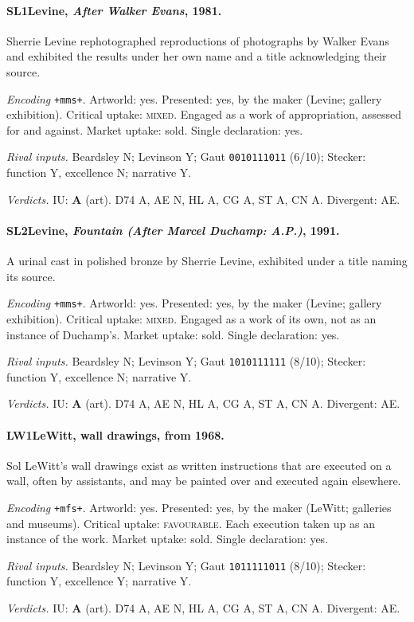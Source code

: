 \paragraph{SL1\enspace Levine, \emph{After Walker Evans}, 1981.}
Sherrie Levine rephotographed reproductions of photographs by Walker Evans and exhibited the results under her own name and a title acknowledging their source.\par
\noindent\textit{Encoding} \texttt{+mms+}. Artworld: yes. Presented: yes, by the maker (Levine; gallery exhibition). Critical uptake: \textsc{mixed}. Engaged as a work of appropriation, assessed for and against. Market uptake: sold. Single declaration: yes.\par
\noindent\textit{Rival inputs.} Beardsley N; Levinson Y; Gaut \texttt{0010111011} (6/10); Stecker: function Y, excellence N; narrative Y.\par
\noindent\textit{Verdicts.} IU: \textbf{A} (art). D74 A, AE N, HL A, CG A, ST A, CN A. Divergent: AE.\par

\paragraph{SL2\enspace Levine, \emph{Fountain (After Marcel Duchamp: A.P.)}, 1991.}
A urinal cast in polished bronze by Sherrie Levine, exhibited under a title naming its source.\par
\noindent\textit{Encoding} \texttt{+mms+}. Artworld: yes. Presented: yes, by the maker (Levine; gallery exhibition). Critical uptake: \textsc{mixed}. Engaged as a work of its own, not as an instance of Duchamp's. Market uptake: sold. Single declaration: yes.\par
\noindent\textit{Rival inputs.} Beardsley N; Levinson Y; Gaut \texttt{1010111111} (8/10); Stecker: function Y, excellence N; narrative Y.\par
\noindent\textit{Verdicts.} IU: \textbf{A} (art). D74 A, AE N, HL A, CG A, ST A, CN A. Divergent: AE.\par

\paragraph{LW1\enspace LeWitt, wall drawings, from 1968.}
Sol LeWitt's wall drawings exist as written instructions that are executed on a wall, often by assistants, and may be painted over and executed again elsewhere.\par
\noindent\textit{Encoding} \texttt{+mfs+}. Artworld: yes. Presented: yes, by the maker (LeWitt; galleries and museums). Critical uptake: \textsc{favourable}. Each execution taken up as an instance of the work. Market uptake: sold. Single declaration: yes.\par
\noindent\textit{Rival inputs.} Beardsley N; Levinson Y; Gaut \texttt{1011111011} (8/10); Stecker: function Y, excellence Y; narrative Y.\par
\noindent\textit{Verdicts.} IU: \textbf{A} (art). D74 A, AE N, HL A, CG A, ST A, CN A. Divergent: AE.\par

